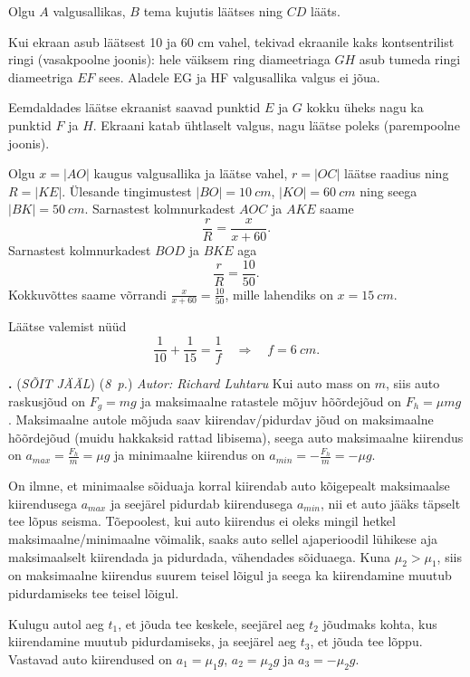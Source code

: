 \documentclass[11pt,a5paper]{article}
\newcommand{\numb}[1]{\vspace{5pt}\textbf{\large #1}}
\newcommand{\nimi}[1]{(\textsl{\small #1})}
\newcommand{\punktid}[1]{(\emph{#1~p.})}
\newcounter{ylesanne}
\newcommand{\yl}[1]{\addtocounter{ylesanne}{1}\numb{\theylesanne.} \nimi{#1} \newblock{}}
\newcommand{\autor}[1]{\emph{ Autor: #1}} %
\begin{document}
Olgu $A$ valgusallikas, $B$ tema kujutis läätses ning $CD$ lääts.

Kui ekraan asub läätsest 10 ja 60 cm vahel, tekivad ekraanile kaks kontsentrilist ringi (vasakpoolne joonis): hele väiksem ring diameetriaga $GH$ asub tumeda ringi diameetriga $EF$ sees. Aladele EG ja HF valgusallika valgus ei jõua.

Eemdaldades läätse ekraanist saavad punktid $E$ ja $G$ kokku üheks nagu ka punktid $F$ ja $H$. Ekraani katab ühtlaselt valgus, nagu läätse poleks (parempoolne joonis).

Olgu $x=|AO|$ kaugus valgusallika ja läätse vahel, $r=|OC|$ läätse raadius ning $R=|KE|$. Ülesande tingimustest $|BO|=\SI{10}{cm}$, $|KO|=\SI{60}{cm}$ ning seega $|BK|=\SI{50}{cm}$. Sarnastest kolmnurkadest $AOC$ ja $AKE$ saame
\[
  \frac{r}{R}=\frac{x}{x+60}.
\]
Sarnastest kolmnurkadest $BOD$ ja $BKE$ aga
\[
  \frac{r}{R}=\frac{10}{50}.
\]
Kokkuvõttes saame võrrandi $\displaystyle{\frac{x}{x+60}=\frac{10}{50}}$, mille lahendiks on $x=\SI{15}{cm}$.

Läätse valemist nüüd
\[
  \frac{1}{10}+\frac{1}{15}=\frac{1}{f}\quad \Rightarrow \quad f=\SI{6}{cm}.
\]


\yl{SÕIT JÄÄL}
\punktid{8} \autor{Richard Luhtaru}
Kui auto mass on $m$, siis auto raskusjõud on $F_g = mg$ ja maksimaalne ratastele mõjuv hõõrdejõud on $F_h = \mu mg$. Maksimaalne autole mõjuda saav kiirendav/pidurdav jõud on maksimaalne hõõrdejõud (muidu hakkaksid rattad libisema), seega auto maksimaalne kiirendus on $a_{max} = \frac{F_h}{m} = \mu g$ ja minimaalne kiirendus on $a_{min}=-\frac{F_h}{m}= -\mu g$.

On ilmne, et minimaalse sõiduaja korral kiirendab auto kõigepealt maksimaalse kiirendusega $a_{max}$ ja seejärel pidurdab kiirendusega $a_{min}$, nii et auto jääks täpselt tee lõpus seisma. Tõepoolest, kui auto kiirendus ei oleks mingil hetkel maksimaalne/minimaalne võimalik, saaks auto sellel ajaperioodil lühikese aja maksimaalselt kiirendada ja pidurdada, vähendades sõiduaega. Kuna $\mu_2 > \mu_1$, siis on maksimaalne kiirendus suurem teisel lõigul ja seega ka kiirendamine muutub pidurdamiseks tee teisel lõigul.

Kulugu autol aeg $t_1$, et jõuda tee keskele, seejärel aeg $t_2$ jõudmaks kohta, kus kiirendamine muutub pidurdamiseks, ja seejärel aeg $t_3$, et jõuda tee lõppu. Vastavad auto kiirendused on $a_1=\mu_1 g$, $a_2=\mu_2 g$ ja $a_3=-\mu_2 g$.
\end{document}
